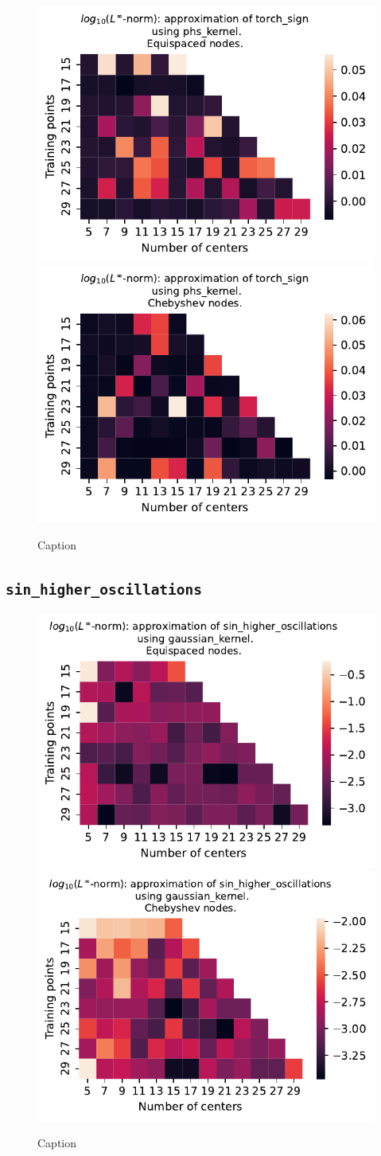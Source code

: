 \documentclass[12pt]{report} %
\begin{document}
\begin{figure}[ht]
  \centering
  \includegraphics[width=.49\textwidth]{imagenes/experiments/1d/variational/torch_sign-Kphs_kernel-Equi.pdf}
  \includegraphics[width=.49\textwidth]{imagenes/experiments/1d/variational/torch_sign-Kphs_kernel-Cheb.pdf}
  \caption{Caption}
  \label{fig:torch-sign-phs}
\end{figure}

\subsection*{\texttt{sin\_higher\_oscillations}}

\begin{figure}[ht]
  \centering

  \includegraphics[width=.49\textwidth]{imagenes/experiments/1d/variational/sin_higher_oscillations-Kgaussian_kernel-Equi.pdf}
  \includegraphics[width=.49\textwidth]{imagenes/experiments/1d/variational/sin_higher_oscillations-Kgaussian_kernel-Cheb.pdf}
  \caption{Caption}
  \label{fig:sin-higher-oscillations-gaussian}
\end{figure}
\end{document}
